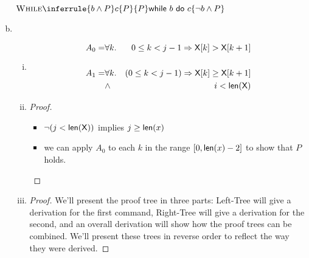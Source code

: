 \begin{enumerate}[(a)]
$\Rule{While}{
    \{ b \wedge P \}
    c
    \{ P \}
}{
    \{ P \}
    \whilestmt{b}{c}
    \{ \neg b \wedge P \}
}$

\item
\begin{enumerate}[i.]
    \item
    \begin{eqnarray*}
        A_0 = & \forall k . & 0 \leq k < j - 1 \Rightarrow  {\sf X}[k] > {\sf X}[k + 1] \\
              & & \\
        A_1 = & \forall k. & (0 \leq k < j - 1) \Rightarrow \textsf{X}[k] \geq \textsf{X}[k + 1] \\
              & \wedge     & i < \textsf{len}(\textsf{X}) \\
    \end{eqnarray*}

    \item
    \begin{proof} \hspace{1cm} \\
        \begin{itemize}
        \item $\neg (j < {\sf len(X)})$ implies $j \geq {\sf len}(x)$
        \item we can apply $A_0$ to each $k$ in the range
        $[0, {\sf len}(x) - 2]$ to show that $P$ holds.
        \end{itemize}
    \end{proof}

    \item
    \begin{proof} We'll present the proof tree in three parts: Left-Tree will
        give a derivation for the first command, Right-Tree will give a
        derivation for the second, and an overall derivation will
        show how the proof trees can be combined. We'll present these trees
        in reverse order to reflect the way they were derived.

        \newcommand{\leftPremise}{
            \{ \dom_a(i + 1) \wedge \dom_a({\sf X}[i])
               \wedge A_1[i - 1 / i][i + 1 \mapsto \X[\X[i]
             \}
             ~\X[i = 1] = \X[i]~
             \{ A_1[i - 1/ i] \}
        }

        \newcommand{\leftBase}{
            \{ A_1 \wedge ((i \geq 0) \wedge {\sf X}[i] < x) \}
            ~\X[i = 1] = \X[i]~
            \{ A_1[i - 1/ i] \}
        }

        \newcommand{\rightPremise}{
            \{ \dom_a(i - 1) \wedge A_1[i - 1/ i] \}
            ~i = i - 1~
            \{ A_1 \}
        }


\end{proof}
\end{enumerate}
\end{enumerate}

